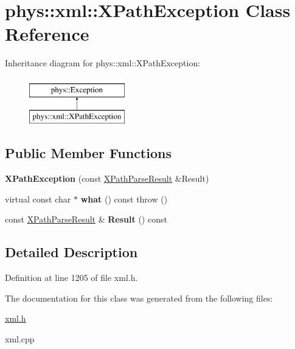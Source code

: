 \hypertarget{classphys_1_1xml_1_1XPathException}{
\section{phys::xml::XPathException Class Reference}
\label{d4/d30/classphys_1_1xml_1_1XPathException}
}
Inheritance diagram for phys::xml::XPathException:\begin{figure}[H]
\begin{center}
\leavevmode
\includegraphics[height=2.000000cm]{d4/d30/classphys_1_1xml_1_1XPathException}
\end{center}
\end{figure}
\subsection*{Public Member Functions}
\begin{DoxyCompactItemize}
\item 
\hypertarget{classphys_1_1xml_1_1XPathException_a39d6511632945aa46b63e80f5364e959}{
{\bfseries XPathException} (const \hyperlink{structphys_1_1xml_1_1XPathParseResult}{XPathParseResult} \&Result)}
\label{d4/d30/classphys_1_1xml_1_1XPathException_a39d6511632945aa46b63e80f5364e959}

\item 
\hypertarget{classphys_1_1xml_1_1XPathException_a36e9d9daa5c8e2680057b2e1642ed225}{
virtual const char $\ast$ {\bfseries what} () const   throw ()}
\label{d4/d30/classphys_1_1xml_1_1XPathException_a36e9d9daa5c8e2680057b2e1642ed225}

\item 
\hypertarget{classphys_1_1xml_1_1XPathException_a817ce63274862eb5e675e1038d8bc9ff}{
const \hyperlink{structphys_1_1xml_1_1XPathParseResult}{XPathParseResult} \& {\bfseries Result} () const }
\label{d4/d30/classphys_1_1xml_1_1XPathException_a817ce63274862eb5e675e1038d8bc9ff}

\end{DoxyCompactItemize}


\subsection{Detailed Description}


Definition at line 1205 of file xml.h.



The documentation for this class was generated from the following files:\begin{DoxyCompactItemize}
\item 
\hyperlink{xml_8h}{xml.h}\item 
xml.cpp\end{DoxyCompactItemize}
